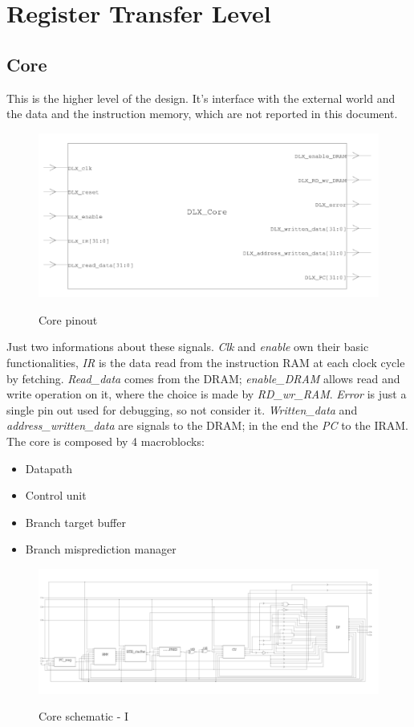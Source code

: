 \chapter{Register Transfer Level}
\section{Core}
This is the higher level of the design. It's interface with the external world and the data and the instruction memory, which are not reported in this document.
\begin{figure}[H]
\centering
\includegraphics[scale=.6]{Immagini/05}
\label{02}
\caption{Core pinout}
\end{figure}

Just two informations about these signals. \textit{Clk} and \textit{enable} own their basic functionalities, \textit{IR} is the data read from the instruction RAM at each clock cycle by fetching. \textit{Read\_data} comes from the DRAM; \textit{enable\_DRAM} allows read and write operation on it, where the choice is made by \textit{RD\_wr\_RAM}. \textit{Error} is just a single pin out used for debugging, so not consider it. \textit{Written\_data} and \textit{address\_written\_data} are signals to the DRAM; in the end the \textit{PC} to the IRAM. \newline
The core is composed by 4 macroblocks:
\begin{itemize}
\item Datapath
\item Control unit
\item Branch target buffer
\item Branch misprediction manager
\end{itemize}
\begin{figure}[H]
\centering
\includegraphics[scale=.6]{Immagini/06}
\label{02}
\caption{Core schematic - I}
\end{figure}

